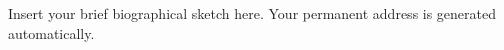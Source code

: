 \documentclass[11pt]{afthesis}
\begin{document}
	
	
	
	
	\begin{vita}
		Insert your brief biographical sketch here. Your permanent
		address is generated automatically.
	\end{vita}
	
	
\end{document}
